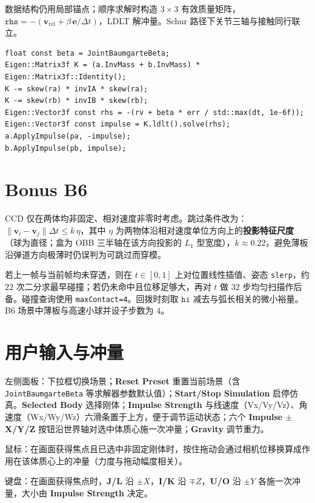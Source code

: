 \documentclass[UTF8,a4paper,11pt]{ctexart}
\begin{document}
数据结构仍用局部锚点；顺序求解时构造 $3\times3$ 有效质量矩阵，$\texttt{rhs}=-(\mathbf{v}_{\mathrm{rel}}+\beta\,\mathbf{e}/\Delta t)$，LDLT 解冲量。Schur 路径下关节三轴与接触同行联立。

\begin{lstlisting}
float const beta = JointBaumgarteBeta;
Eigen::Matrix3f K = (a.InvMass + b.InvMass) * Eigen::Matrix3f::Identity();
K -= skew(ra) * invIA * skew(ra);
K -= skew(rb) * invIB * skew(rb);
Eigen::Vector3f const rhs = -(rv + beta * err / std::max(dt, 1e-6f));
Eigen::Vector3f const impulse = K.ldlt().solve(rhs);
a.ApplyImpulse(pa, -impulse);
b.ApplyImpulse(pb, impulse);
\end{lstlisting}

\section{Bonus B6}
CCD 仅在两体均非固定、相对速度非零时考虑。跳过条件改为：$\|\mathbf{v}_i-\mathbf{v}_j\|\Delta t \le k\,\eta$，其中 $\eta$ 为两物体沿相对速度单位方向上的\textbf{投影特征尺度}（球为直径；盒为 OBB 三半轴在该方向投影的 $L_1$ 型宽度），$k\approx 0.22$，避免薄板沿弹道方向极薄时仍误判为可跳过而穿模。

若上一帧与当前帧均未穿透，则在 $t\in[0,1]$ 上对位置线性插值、姿态 \texttt{slerp}，约 $22$ 次二分求最早碰撞；若仍未命中且位移足够大，再对 $t$ 做 $32$ 步均匀扫描作后备。碰撞查询使用 \texttt{maxContact=4}。回拨时刻取 $\texttt{hi}$ 减去与弧长相关的微小裕量。B6 场景中薄板与高速小球并设子步数为 $4$。

\section{用户输入与冲量}
左侧面板：下拉框切换场景；\textbf{Reset Preset} 重置当前场景（含 \texttt{JointBaumgarteBeta} 等求解器参数默认值）；\textbf{Start/Stop Simulation} 启停仿真。\textbf{Selected Body} 选择刚体；\textbf{Impulse Strength} 与线速度（Vx/Vy/Vz）、角速度（Wx/Wy/Wz）六滑条置于上方，便于调节运动状态；六个 \textbf{Impulse $\pm$X/Y/Z} 按钮沿世界轴对选中体质心施一次冲量；\textbf{Gravity} 调节重力。

鼠标：在画面获得焦点且已选中非固定刚体时，按住拖动会通过相机位移换算成作用在该体质心上的冲量（力度与拖动幅度相关）。

键盘：在画面获得焦点时，\textbf{J/L} 沿 $\pm X$，\textbf{I/K} 沿 $\mp Z$，\textbf{U/O} 沿 $\pm Y$ 各施一次冲量，大小由 \textbf{Impulse Strength} 决定。
\end{document}
